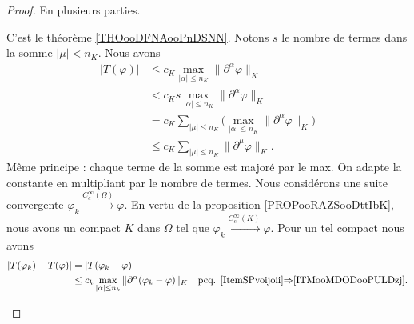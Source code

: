 \begin{proof}
	En plusieurs parties.
	\begin{subproof}
		C'est le théorème \ref{THOooDFNAooPnDSNN}.
		\spitem[\ref{ITMooMDODooPULDzj} \( \Rightarrow\) \ref{ItemSPvoijoii}]
		Notons \( s\) le nombre de termes dans la somme \( | \mu |<n_K\). Nous avons
		\begin{subequations}
			\begin{align}
				| T(\varphi) | & \leq c_K\max_{| \alpha |\leq n_K}\| \partial^{\alpha}\varphi \|_K                                \\
				               & < c_Ks\max_{| \alpha |\leq n_K}\| \partial^{\alpha}\varphi \|_K                                  \\
				               & = c_K\sum_{| \mu |\leq n_K}\Big( \max_{| \alpha |\leq n_K}\| \partial^{\alpha}\varphi \|_K \Big) \\
				               & \leq c_K\sum_{| \mu |\leq n_K}\| \partial^{\mu}\varphi \|_K.
			\end{align}
		\end{subequations}
		\spitem[\ref{ItemSPvoijoii} \( \Rightarrow\) \ref{ITMooMDODooPULDzj}]
		Même principe : chaque terme de la somme est majoré par le max. On adapte la constante en multipliant par le nombre de termes.
		\spitem[\ref{ItemSPvoijoii} \( \Rightarrow\) \ref{ITEMooBXFSooYtAXjy}]
		Nous considérons une suite convergente \( \varphi_k\stackrel{ C^{\infty}_c(\Omega)}{\longrightarrow} \varphi\). En vertu de la proposition \ref{PROPooRAZSooDttIbK}, nous avons un compact \( K\) dans \( \Omega\) tel que \( \varphi_k\stackrel{ C^{\infty}_c(K)}{\longrightarrow} \varphi\). Pour un tel compact nous avons
		\begin{subequations}
			\begin{align}
				| T(\varphi_k)-T(\varphi) | & = | T(\varphi_k-\varphi) |                                                                                                                              \\
				                            & \leq c_k\max_{| \alpha |\leq n_k}\| \partial^{\alpha}(\varphi_k-\varphi) \|_K & \text{pcq. \ref{ItemSPvoijoii}\( \Rightarrow\)\ref{ITMooMDODooPULDzj}.} \\

\end{align}
\end{subequations}
\end{subproof}
\end{proof}
